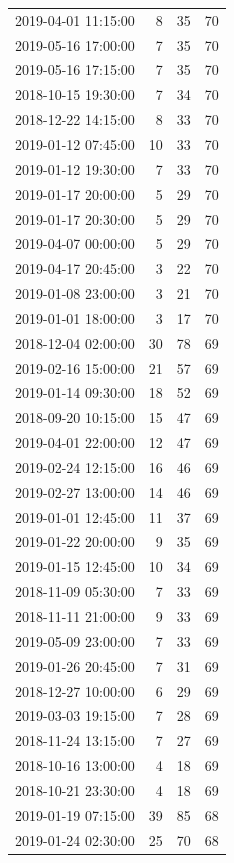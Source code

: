 \begin{tabular}{lrrr}
2019-04-01 11:15:00 & 8 & 35 & 70 \\
2019-05-16 17:00:00 & 7 & 35 & 70 \\
2019-05-16 17:15:00 & 7 & 35 & 70 \\
2018-10-15 19:30:00 & 7 & 34 & 70 \\
2018-12-22 14:15:00 & 8 & 33 & 70 \\
2019-01-12 07:45:00 & 10 & 33 & 70 \\
2019-01-12 19:30:00 & 7 & 33 & 70 \\
2019-01-17 20:00:00 & 5 & 29 & 70 \\
2019-01-17 20:30:00 & 5 & 29 & 70 \\
2019-04-07 00:00:00 & 5 & 29 & 70 \\
2019-04-17 20:45:00 & 3 & 22 & 70 \\
2019-01-08 23:00:00 & 3 & 21 & 70 \\
2019-01-01 18:00:00 & 3 & 17 & 70 \\
2018-12-04 02:00:00 & 30 & 78 & 69 \\
2019-02-16 15:00:00 & 21 & 57 & 69 \\
2019-01-14 09:30:00 & 18 & 52 & 69 \\
2018-09-20 10:15:00 & 15 & 47 & 69 \\
2019-04-01 22:00:00 & 12 & 47 & 69 \\
2019-02-24 12:15:00 & 16 & 46 & 69 \\
2019-02-27 13:00:00 & 14 & 46 & 69 \\
2019-01-01 12:45:00 & 11 & 37 & 69 \\
2019-01-22 20:00:00 & 9 & 35 & 69 \\
2019-01-15 12:45:00 & 10 & 34 & 69 \\
2018-11-09 05:30:00 & 7 & 33 & 69 \\
2018-11-11 21:00:00 & 9 & 33 & 69 \\
2019-05-09 23:00:00 & 7 & 33 & 69 \\
2019-01-26 20:45:00 & 7 & 31 & 69 \\
2018-12-27 10:00:00 & 6 & 29 & 69 \\
2019-03-03 19:15:00 & 7 & 28 & 69 \\
2018-11-24 13:15:00 & 7 & 27 & 69 \\
2018-10-16 13:00:00 & 4 & 18 & 69 \\
2018-10-21 23:30:00 & 4 & 18 & 69 \\
2019-01-19 07:15:00 & 39 & 85 & 68 \\
2019-01-24 02:30:00 & 25 & 70 & 68 \\

\end{tabular}
